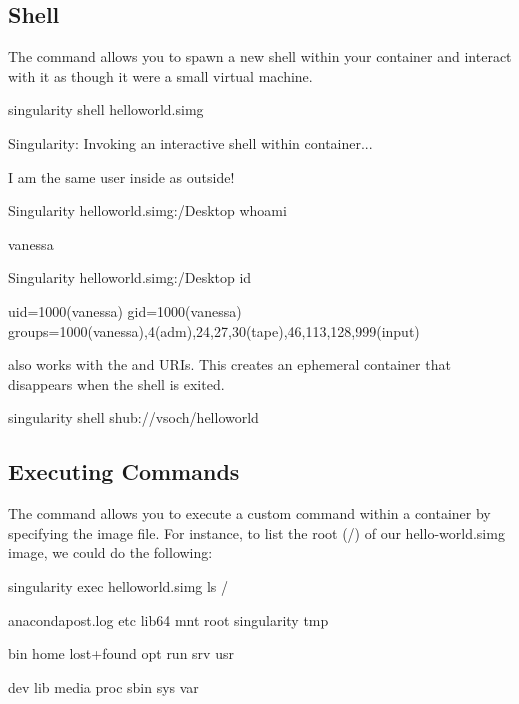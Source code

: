 \documentclass[letterpaper,10pt,english]{sphinxmanual}
\begin{document}
\subsection{Shell}
\label{\detokenize{quick_start:shell}}
The {\hyperref[\detokenize{appendix:shell-command}]{}} command allows you to spawn a new shell within your container and
interact with it as though it were a small virtual machine.

%
\begin{sphinxVerbatim}[commandchars=\\\{\}]
\PYGZdl{} singularity shell hello\PYGZhy{}world.simg

Singularity: Invoking an interactive shell within container...


\PYGZsh{} I am the same user inside as outside!

Singularity hello\PYGZhy{}world.simg:\PYGZti{}/Desktop\PYGZgt{} whoami

vanessa


Singularity hello\PYGZhy{}world.simg:\PYGZti{}/Desktop\PYGZgt{} id

uid=1000(vanessa) gid=1000(vanessa) groups=1000(vanessa),4(adm),24,27,30(tape),46,113,128,999(input)
\end{sphinxVerbatim}

 also works with the  and  URIs. This creates an ephemeral container that
disappears when the shell is exited.

%
\begin{sphinxVerbatim}[commandchars=\\\{\}]
\PYGZdl{} singularity shell shub://vsoch/hello\PYGZhy{}world
\end{sphinxVerbatim}


\subsection{Executing Commands}
\label{\detokenize{quick_start:executing-commands}}
The {\hyperref[\detokenize{appendix:exec-command}]{}} command allows you to execute a custom command within a container by
specifying the image file. For instance, to list the root (/) of our
hello-world.simg image, we could do the following:

%
\begin{sphinxVerbatim}[commandchars=\\\{\}]
\PYGZdl{} singularity exec hello\PYGZhy{}world.simg ls /

anaconda\PYGZhy{}post.log  etc   lib64       mnt   root  singularity  tmp

bin        home  lost+found  opt   run   srv          usr

dev        lib   media       proc  sbin  sys          var
\end{sphinxVerbatim}
\end{document}
